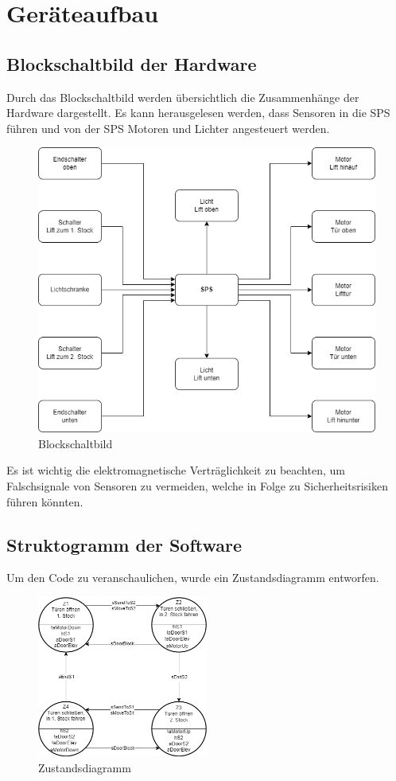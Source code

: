\section{Geräteaufbau}

\subsection{Blockschaltbild der Hardware}

Durch das Blockschaltbild werden übersichtlich die Zusammenhänge der Hardware dargestellt. Es kann herausgelesen werden, dass Sensoren in die SPS führen und von der SPS Motoren und Lichter angesteuert werden.

\begin{figure}[h!]
    \centering
    \includegraphics[width=\textwidth]{./images/Blockschaltbild.png}
    \caption[Blockschaltbild]{Blockschaltbild}
\end{figure}

Es ist wichtig die elektromagnetische Verträglichkeit zu beachten, um Falschsignale von Sensoren zu vermeiden, welche in Folge zu Sicherheitsrisiken führen könnten.

\newpage

\subsection{Struktogramm der Software}

Um den Code zu veranschaulichen, wurde ein Zustandsdiagramm entworfen.

\begin{figure}[h!]
    \centering
    \includegraphics[width=0.5\textwidth]{./images/Zustandsdiagramm.png}
    \caption[Zustandsdiagramm]{Zustandsdiagramm}
\end{figure}